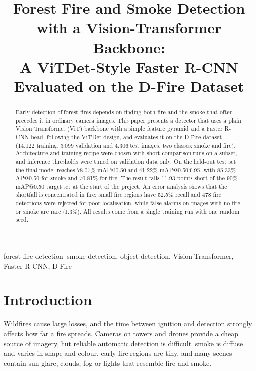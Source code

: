 \documentclass[conference]{IEEEtran}
\begin{document}
\title{Forest Fire and Smoke Detection with a Vision-Transformer Backbone: \\ A ViTDet-Style Faster R-CNN Evaluated on the D-Fire Dataset}

\author{
}

\maketitle

\begin{abstract}
Early detection of forest fires depends on finding both fire and the smoke that often precedes it in ordinary camera images. This paper presents a detector that uses a plain Vision Transformer (ViT) backbone with a simple feature pyramid and a Faster R-CNN head, following the ViTDet design, and evaluates it on the D-Fire dataset (14{,}122 training, 3{,}099 validation and 4{,}306 test images, two classes: smoke and fire). Architecture and training recipe were chosen with short comparison runs on a subset, and inference thresholds were tuned on validation data only. On the held-out test set the final model reaches 78.07\% mAP@0.50 and 41.22\% mAP@0.50:0.95, with 85.33\% AP@0.50 for smoke and 70.81\% for fire. The result falls 11.93 points short of the 90\% mAP@0.50 target set at the start of the project. An error analysis shows that the shortfall is concentrated in fire: small fire regions have 52.5\% recall and 478 fire detections were rejected for poor localisation, while false alarms on images with no fire or smoke are rare (1.3\%). All results come from a single training run with one random seed.
\end{abstract}

\begin{IEEEkeywords}
forest fire detection, smoke detection, object detection, Vision Transformer, Faster R-CNN, D-Fire
\end{IEEEkeywords}

\section{Introduction}
Wildfires cause large losses, and the time between ignition and detection strongly affects how far a fire spreads. Cameras on towers and drones provide a cheap source of imagery, but reliable automatic detection is difficult: smoke is diffuse and varies in shape and colour, early fire regions are tiny, and many scenes contain sun glare, clouds, fog or lights that resemble fire and smoke.
\end{document}
